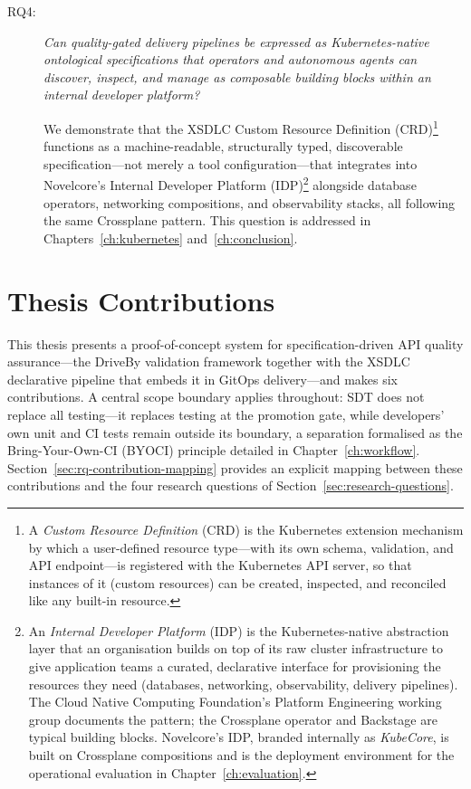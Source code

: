 \begin{description}
  \item[RQ4:] \textit{Can quality-gated delivery pipelines be expressed as Kubernetes-native ontological specifications that operators and autonomous agents can discover, inspect, and manage as composable building blocks within an internal developer platform?}

  We demonstrate that the XSDLC Custom Resource Definition (CRD)\footnote{A \emph{Custom Resource Definition} (CRD) is the Kubernetes extension mechanism by which a user-defined resource type---with its own schema, validation, and API endpoint---is registered with the Kubernetes API server, so that instances of it (custom resources) can be created, inspected, and reconciled like any built-in resource.} functions as a machine-readable, structurally typed, discoverable specification---not merely a tool configuration---that integrates into Novelcore's Internal Developer Platform (IDP)\footnote{An \emph{Internal Developer Platform} (IDP) is the Kubernetes-native abstraction layer that an organisation builds on top of its raw cluster infrastructure to give application teams a curated, declarative interface for provisioning the resources they need (databases, networking, observability, delivery pipelines). The Cloud Native Computing Foundation's Platform Engineering working group documents the pattern; the Crossplane operator and Backstage are typical building blocks. Novelcore's IDP, branded internally as \emph{KubeCore}, is built on Crossplane compositions and is the deployment environment for the operational evaluation in Chapter~\ref{ch:evaluation}.} alongside database operators, networking compositions, and observability stacks, all following the same Crossplane pattern. This question is addressed in Chapters~\ref{ch:kubernetes} and~\ref{ch:conclusion}.
\end{description}

\section{Thesis Contributions}
\label{sec:contributions}

This thesis presents a proof-of-concept system for specification-driven API quality assurance---the DriveBy validation framework together with the XSDLC declarative pipeline that embeds it in GitOps delivery---and makes six contributions. A central scope boundary applies throughout: SDT does not replace all testing---it replaces testing at the promotion gate, while developers' own unit and CI tests remain outside its boundary, a separation formalised as the Bring-Your-Own-CI (BYOCI) principle detailed in Chapter~\ref{ch:workflow}. Section~\ref{sec:rq-contribution-mapping} provides an explicit mapping between these contributions and the four research questions of Section~\ref{sec:research-questions}.

